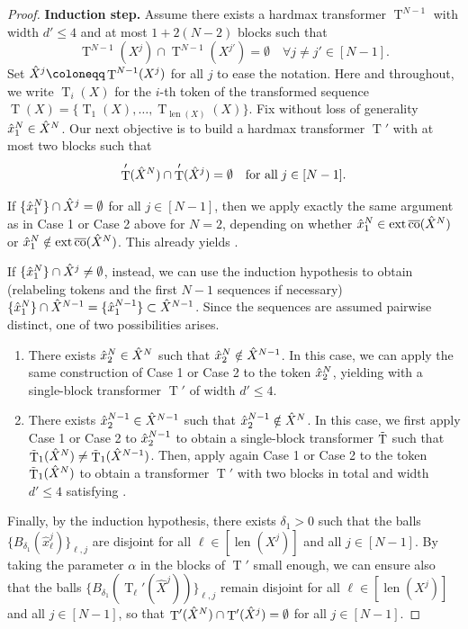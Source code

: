 \documentclass[pdflatex,sn-mathphys-num]{sn-jnl}%
\theoremstyle{thmstyleone}%
\theoremstyle{thmstyletwo}%
\theoremstyle{thmstylethree}%
\numberwithin{equation}{section}
\DeclareMathOperator{\T}{\mathrm{T}}
\DeclareMathOperator{\co}{\overline{co}}
\DeclareMathOperator{\ext}{ext}
\DeclareMathOperator{\len}{len}
\begin{document}
\begin{proof}
\noindent \textbf{Induction step.} Assume there exists a hardmax transformer $\T^{N-1}$ with width $d'\leq 4$ and at most $1 + 2(N-2)$ blocks such that 
$$
    \T^{N-1}(X^j) \cap \T^{N-1}(X^{j'}) = \emptyset \quad \forall j\neq j'\in [N-1].
$$
Set $\Hat{X}^j \coloneqq \T^{N-1}(X^j)$ for all $j$ to ease the notation. Here and throughout, we write $\T_i(X)$ for the $i$-th token of the transformed sequence $\T(X) = \{ \T_1(X), \dots, \T_{\len(X)}(X) \}$. Fix without loss of generality $\Hat{x}_1^N \in \Hat{X}^N$. Our next objective is to build a hardmax transformer $\T'$ with at most two blocks such that
\begin{equation}\label{eq:proofSeparationLemma}
    \T' (\Hat{X}^N) \cap \T' (\Hat{X}^{j}) = \emptyset \quad \text{for all} \; j\in [N-1].
\end{equation}

If $\{ \Hat{x}_1^N \} \cap \Hat{X}^j = \emptyset$ for all $j\in [N - 1]$, then we apply exactly the same argument as in Case 1 or Case 2 above for $N = 2$, depending on whether $\Hat{x}_1^N \in \ext \co (\Hat{X}^N)$ or $\Hat{x}_1^N \notin \ext \co (\Hat{X}^N)$. This already yields .

If $\{ \Hat{x}_1^N \} \cap \Hat{X}^j \neq \emptyset$, instead, we can use the induction hypothesis to obtain (relabeling tokens and the first $N-1$ sequences if necessary) $\{\Hat{x}_1^N \} \cap \Hat{X}^{N-1} = \{ \Hat{x}_1^{N-1} \} \subset \Hat{X}^{N-1}$. Since the sequences are assumed pairwise distinct, one of two possibilities arises.
\begin{enumerate}%
    \item[i)] There exists $\Hat{x}_2^N \in \Hat{X}^N$ such that $\Hat{x}_2^N \notin \Hat{X}^{N-1}$. In this case, we can apply the same construction of Case 1 or Case 2 to the token $\Hat{x}_2^N$, yielding  with a single-block transformer $\T'$ of width $d' \leq 4$.

    \item[ii)] There exists $\Hat{x}_2^{N-1} \in \Hat{X}^{N-1}$ such that $\Hat{x}_2^{N-1} \notin \Hat{X}^N$. In this case, we first apply Case 1 or Case 2 to $\Hat{x}_2^{N-1}$ to obtain a single-block transformer $\Tilde{\T}$ such that $\Tilde{\T}_1(\Hat{X}^N) \neq \Tilde{\T}_1(\Hat{X}^{N-1})$. Then, apply again Case 1 or Case 2 to the token $\Tilde{\T}_1(\Hat{X}^N)$ to obtain a transformer $\T'$ with two blocks in total and width $d'\leq 4$ satisfying .
\end{enumerate}
Finally, by the induction hypothesis, there exists $\delta_1 > 0$ such that the balls $\{ B_{\delta_1} (\hat{x}_\ell^j )\}_{\ell, j}$ are disjoint for all $\ell \in [\len (X^j)]$ and all $j\in [N-1]$. By taking the parameter $\alpha$ in the blocks of $\T'$ small enough, we can ensure also that the balls $\{ B_{\delta_1} (\T_\ell'(\hat{X}^j)) \}_{\ell, j}$ remain disjoint for all $\ell \in [\len (X^j)]$ and all $j\in [N-1]$, so that $\T' (\Hat{X}^N) \cap \T' (\Hat{X}^{j}) = \emptyset$ for all $j\in [N - 1]$.


\end{proof}
\end{document}
